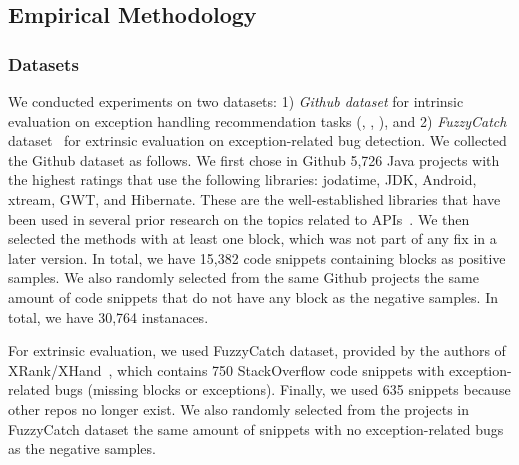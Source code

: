 \subsection{Empirical Methodology}

\subsubsection{Datasets}


We conducted experiments on two datasets: 1) {\em Github dataset}
for intrinsic evaluation on exception handling recommendation tasks
({\xblock}, {\xstate}, {\xtype}), and 2) {\em FuzzyCatch}
dataset~\cite{xrank-fse20} for extrinsic evaluation on
exception-related bug detection.
%
%
We collected the Github dataset as follows. We first chose in Github
5,726 Java projects with the highest ratings that use
the following libraries: jodatime, JDK, Android, xtream, GWT, and
Hibernate. These are the well-established libraries that have been used
in several prior research on the topics related to
APIs~\cite{icse18,liveapi14}. We then selected the methods with at
least one  block, which was not part of any fix in
a later version.
In total, we have
15,382 code snippets containing  blocks as positive
samples. We also randomly selected from the same Github projects the
same amount of code snippets that do not have any 
block as the negative samples. In total, we have 30,764 instanaces.

For extrinsic evaluation, we used FuzzyCatch dataset, provided by the
authors of XRank/XHand~\cite{xrank-fse20}, which contains 750
StackOverflow code snippets with exception-related bugs (missing
 blocks or exceptions). Finally, we used 635 snippets
because other repos no longer exist. We also randomly selected from
the projects in FuzzyCatch dataset the same amount of snippets with no
exception-related bugs as the negative samples.

